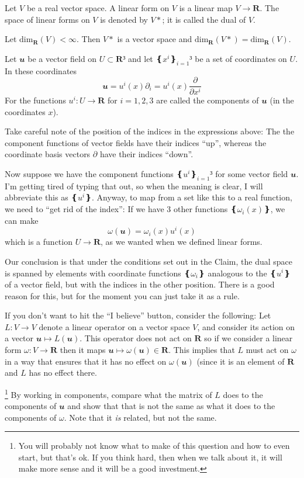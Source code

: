 \begin{definition}
Let $V$ be a real vector space. A linear form on $V$ is a linear map $V → 𝐑$. The space of linear forms on $V$ is denoted by $V*$; it is called the dual of $V$.
\end{definition}

\begin{claim}
Let $\textrm{dim}_𝐑 (V) < ∞$. Then $V*$ is a vector space and $\textrm{dim}_𝐑 (V*) = \textrm{dim}_𝐑 (V)$.
\end{claim}

\begin{definition}
Let $𝒖$ be a vector field on $U⊂ 𝐑³$ and let $❴x^i ❵_{i=1}³$ be a set of coordinates on $U$. In these coordinates
$$
𝒖 = u^i(x) ∂_i = u^i(x) \frac ∂{∂x^i}
$$ 
For the functions $u^i :U→ 𝐑$ for $i=1,2,3$ are called the components of $𝒖$ (in the coordinates $x$).
\end{definition}

Take careful note of the position of the indices in the expressions above: The the component functions of vector fields have their indices “up”, whereas the coordinate basis vectors $∂$ have their indices “down”.

Now suppose we have the component functions $❴u^i❵_{i=1}³$ for some vector field $𝒖$. I'm getting tired of typing that out, so when the meaning is clear, I will abbreviate this as $❴u^i❵$. 
Anyway, to map from a set like this to a real function, we need to “get rid of the index”: If we have 3 other functions $❴ω_i(x)❵$, we can make 
$$
ω(𝒖) = ω_i(x) u^i(x)
$$
which is a function $U→ 𝐑$, as we wanted when we defined linear forms. 

Our conclusion is that under the conditions set out in the Claim, the dual space is spanned by elements with coordinate functions $❴ω_i❵$ analogous to the $❴u^i❵$ of a vector field, but with the indices in the other position. There is a good reason for this, but for the moment you can just take it as a rule. 

If you don't want to hit the “I believe”  button, consider the following: Let $L : V→ V$ denote a linear operator on a vector space $V$, and consider its action on a vector $𝒖 ↦ L(𝒖)$. This operator does not act on $𝐑$ so if we consider a linear form $ω : V→ 𝐑$ then it maps $𝒖 ↦ ω(𝒖) ∈ 𝐑$. This implies that $L$ must act on $ω$ in a way that ensures that it has no effect on $ω(𝒖)$ (since it is an element of $𝐑$ and $L$ has no effect there.

\begin{exercise}\footnote{You will probably not know what to make of this question and how to even start, but that's ok. If you think hard, then when we talk about it, it will make more sense and it will be a good investment.}
By working in components, compare what the matrix of $L$ does to the components of $𝒖$ and show that that is not the same as what it does to the components of $ω$. Note that it {\em is} related, but not the same.
\end{exercise} 

